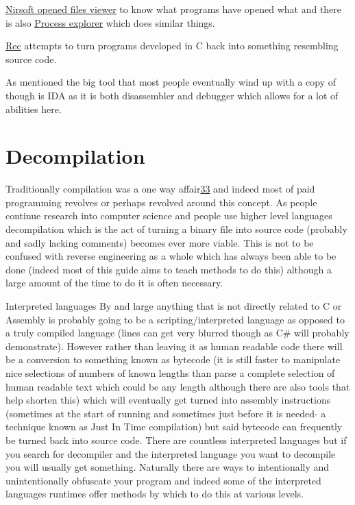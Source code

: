 \documentclass[
]{book}
\begin{document}
\href{http://www.nirsoft.net/utils/opened_files_view.html}{Nirsoft opened files viewer} to know what programs have opened what and there is also \href{http://technet.microsoft.com/en-us/sysinternals/bb896653}{Process explorer} which does similar things.

\href{http://www.backerstreet.com/rec/rec.htm}{Rec} attempts to turn programs developed in C back into something resembling source code.

As mentioned the big tool that most people eventually wind up with a copy of though is IDA as it is both disassembler and debugger which allows for a lot of abilities here.

\hypertarget{decompilation}{%
\section{Decompilation}\label{decompilation}}

Traditionally compilation was a one way affair\href{romhacking202034.html\#fn33x0}{33} and indeed most of paid programming revolves or perhaps revolved around this concept. As people continue research into computer science and people use higher level languages decompilation which is the act of turning a binary file into source code (probably and sadly lacking comments) becomes ever more viable. This is not to be confused with reverse engineering as a whole which has always been able to be done (indeed most of this guide aims to teach methods to do this) although a large amount of the time to do it is often necessary.

Interpreted languages By and large anything that is not directly related to C or Assembly is probably going to be a scripting/interpreted language as opposed to a truly compiled language (lines can get very blurred though as C\# will probably demonstrate). However rather than leaving it as human readable code there will be a conversion to something known as bytecode (it is still faster to manipulate nice selections of numbers of known lengths than parse a complete selection of human readable text which could be any length although there are also tools that help shorten this) which will eventually get turned into assembly instructions (sometimes at the start of running and sometimes just before it is needed- a technique known as Just In Time compilation) but said bytecode can frequently be turned back into source code. There are countless interpreted languages but if you search for decompiler and the interpreted language you want to decompile you will usually get something. Naturally there are ways to intentionally and unintentionally obfuscate your program and indeed some of the interpreted languages runtimes offer methods by which to do this at various levels.
\end{document}
